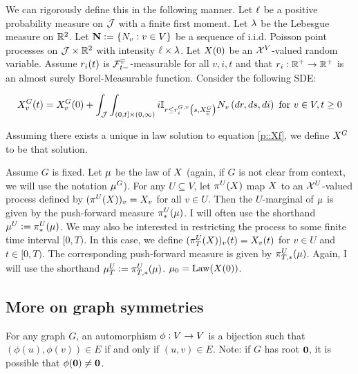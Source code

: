 \ind We can rigorously define this in the following manner. Let \(\ell\) be a positive probability measure on \(\mathcal{J}\) with a finite first moment. Let \(\lambda\) be the Lebesgue measure on \(\mathbb{R}^2\). Let \(\mathbf{N} := \{N_{v}:v \in V\}\) be a sequence of i.i.d. Poisson point processes on \(\mathcal{J}\times \mathbb{R}^2\) with intensity \(\ell\times \lambda\). Let \(X(0)\) be an \(\mathcal{X}^V\)-valued random variable. Assume \(r_{i}(t)\) is \(\mathcal{F}^{\overline{v}}_{t-}\)-measurable for all \(v,i,t\) and that \(r_{i}:\mathbb{R}^+ \rightarrow\mathbb{R}^+\) is an almost surely Borel-Measurable function. Consider the following SDE:

\begin{equation}
\Xf\gind{G}\vind{v}\tme{t} = \Xf\gind{G}\vind{v}\tme{0} + \int_{\jmps}\int_{(0,t]\times (0,\infty)} i\mb{I}_{r \leq \rate\gvpara{G}{v}\stpara{i}\tmepro{s}{\Xf\gind{G}\vind{\cl{v}}}{}} \poiss\poissv{v}\left(dr,ds,di\right) \te{ for } v\in V, t \geq 0
\label{p::Xf}
\end{equation}

Assuming there exists a unique in law solution to equation \eqref{p::Xf}, we define \(X^{G}\) to be that solution. 

\ind Assume \(G\) is fixed. Let \(\mu\) be the law of \(X\) (again, if \(G\) is not clear from context, we will use the notation \(\mu^{G}\)). For any \(U \subseteq V\), let \(\pi^{U}(X)\) map \(X\) to an \(\mathcal{X}^U\)-valued process defined by \((\pi^{U}(X))_{v} = X_{v}\) for all \(v\in U\). Then the \(U\)-marginal of \(\mu\) is given by the push-forward measure \(\pi^{U}_*(\mu)\). I will often use the shorthand \(\mu^{U} := \pi_*^{U}(\mu)\). We may also be interested in restricting the process to some finite time interval \([0,T)\). In this case, we define \((\pi^{U}_{T}(X))_{v}(t) = X_{v}(t)\) for \(v \in U\) and \(t \in [0,T)\). The corresponding push-forward measure is given by \(\pi^{U}_{T,*}(\mu)\). Again, I will use the shorthand \(\mu^{U}_{T} := \pi^{U}_{T,*}(\mu)\). \(\mu_{0} = \text{Law}(X(0))\).

\subsection{More on graph symmetries}
\label{not::sym}

\begin{defn}
For any graph \(G\), an automorphism \(\phi: V \rightarrow V\) is a bijection such that \((\phi(u),\phi(v))\in E\) if and only if \((u,v)\in E\). Note: if \(G\) has root \(\mathbf{0}\), it is possible that \(\phi(\mathbf{0}) \neq \mathbf{0}\).
\label{sym::siso}
\end{defn}

